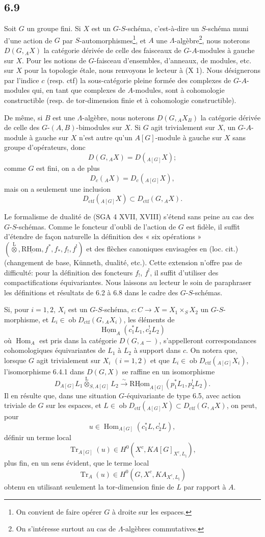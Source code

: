 \documentclass[11pt]{article}
\DeclareMathOperator{\Hom}{Hom}
\newcommand{\R}{\mathrm{R}}\newcommand{\RHomCore}{\mathrm{RHom}}
\providecommand{\RHom}{\RHomCore}
\providecommand{\uRHom}{\underline{\RHom}}
\providecommand{\uHom}{\underline{\Hom}}
\providecommand{\Tr}{\operatorname{Tr}}
\providecommand{\Tr}{\operatorname{Tr}}
\providecommand{\lten}{\overset{\mathrm L}{\otimes}}
\providecommand{\Ob}{\operatorname{ob}}
\providecommand{\Tr}{\operatorname{Tr}}
\providecommand{\RHom}{\RHomCore}
\providecommand{\Hom}{\operatorname{Hom}}
\providecommand{\lten}{\overset{\mathrm L}{\otimes}}
\providecommand{\RHom}{\R\mathcal{H}om}
\providecommand{\lten}{\overset{\mathrm L}{\otimes}}
\providecommand{\Ob}{\operatorname{ob}}
\providecommand{\R}{\mathrm R}
\providecommand{\Tr}{\operatorname{Tr}}
\providecommand{\lten}{\overset{\mathrm L}{\otimes}}
\providecommand{\lten}{\overset{\mathrm L}{\otimes}}
\providecommand{\Ob}{\operatorname{Ob}}
\providecommand{\lten}{\overset{\mathrm L}{\otimes}}
\providecommand{\RHom}{\RHomCore}
\providecommand{\Hom}{\operatorname{Hom}}
\providecommand{\Tr}{\operatorname{Tr}}
\providecommand{\Ob}{\operatorname{ob}}
\providecommand{\Ob}{\operatorname{Ob}}
\providecommand{\lten}{\overset{\mathrm L}{\otimes}}
\begin{document}
\subsection*{6.9}
Soit $G$ un groupe fini. Si $X$ est un $G$-$S$-schéma, c'est-à-dire un $S$-schéma muni d'une action de $G$ par $S$-automorphismes\footnote{On convient de faire opérer $G$ à droite sur les espaces.}, et $A$ une $\Lambda$-algèbre\footnote{On s'intéresse surtout au cas de $\Lambda$-algèbres commutatives.}, nous noterons $D(G,{}_AX)$ la catégorie dérivée de celle des faisceaux de $G$-$A$-modules à gauche sur $X$. Pour les notions de $G$-faisceau d'ensembles, d'anneaux, de modules, etc. sur $X$ pour la topologie étale, nous renvoyons le lecteur à (X 1). Nous désignerons par l'indice $c$ (resp. ctf) la sous-catégorie pleine formée des complexes de $G$-$A$-modules qui, en tant que complexes de $A$-modules, sont à cohomologie constructible (resp. de tor-dimension finie et à cohomologie constructible).

De même, si $B$ est une $\Lambda$-algèbre, nous noterons $D(G,{}_AX_B)$ la catégorie dérivée de celle des $G$-$(A,B)$-bimodules sur $X$. Si $G$ agit trivialement sur $X$, un $G$-$A$-module à gauche sur $X$ n'est autre qu'un $A[G]$-module à gauche sur $X$ sans groupe d'opérateurs, donc
\[
D(G,{}_AX)=D({}_{A[G]}X);
\]
comme $G$ est fini, on a de plus
\[
D_c({}_AX)=D_c({}_{A[G]}X),
\]
mais on a seulement une inclusion
\[
D_{\mathrm{ctf}}({}_{A[G]}X)\subset D_{\mathrm{ctf}}(G,{}_AX).
\]

Le formalisme de dualité de (SGA 4 XVII, XVIII) s'étend sans peine au cas des $G$-$S$-schémas. Comme le foncteur d'oubli de l'action de $G$ est fidèle, il suffit d'étendre de façon naturelle la définition des « six opérations » $(\lten,\uRHom,f^*,f_*,f_!,f^!)$ et des flèches canoniques envisagées en (loc. cit.) (changement de base, Künneth, dualité, etc.). Cette extension n'offre pas de difficulté: pour la définition des foncteurs $f_!$, $f^!$, il suffit d'utiliser des compactifications équivariantes. Nous laissons au lecteur le soin de paraphraser les définitions et résultats de 6.2 à 6.8 dans le cadre des $G$-$S$-schémas.

Si, pour $i=1,2$, $X_i$ est un $G$-$S$-schéma, $c:C\to X=X_1\times_SX_2$ un $G$-$S$-morphisme, et $L_i\in\Ob D_{\mathrm{ctf}}(G,{}_AX_i)$, les éléments de
\[
\uHom_A(c_1^*L_1,c_2^!L_2)
\]
où $\Hom_A$ est pris dans la catégorie $D(G,{}_A-)$, s'appelleront correspondances cohomologiques équivariantes de $L_1$ à $L_2$ à support dans $c$. On notera que, lorsque $G$ agit trivialement sur $X_i$ $(i=1,2)$ et que $L_i\in\Ob D_{\mathrm{ctf}}({}_{A[G]}X_i)$, l'isomorphisme 6.4.1 dans $D(G,X)$ se raffine en un isomorphisme
\[
D_{A[G]}L_1\lten_{S,A[G]}L_2
\xrightarrow{\sim}
\uRHom_{A[G]}(p_1^*L_1,p_2^!L_2).
\]
Il en résulte que, dans une situation $G$-équivariante de type 6.5, avec action triviale de $G$ sur les espaces, et $L\in\Ob D_{\mathrm{ctf}}({}_{A[G]}X)\subset D_{\mathrm{ctf}}(G,{}_AX)$, on peut, pour
\[
u\in\Hom_{A[G]}(c_1^*L,c_2^!L),
\]
définir un terme local
\[
\Tr_{A[G]}(u)\in H^0(X^c,KA[G]_{X^c,L_{\natural}}),
\]
plus fin, en un sens évident, que le terme local
\[
\Tr_A(u)\in H^0(G,X^c,KA_{X^c,L_{\natural}})
\]
obtenu en utilisant seulement la tor-dimension finie de $L$ par rapport à $A$.
\end{document}
